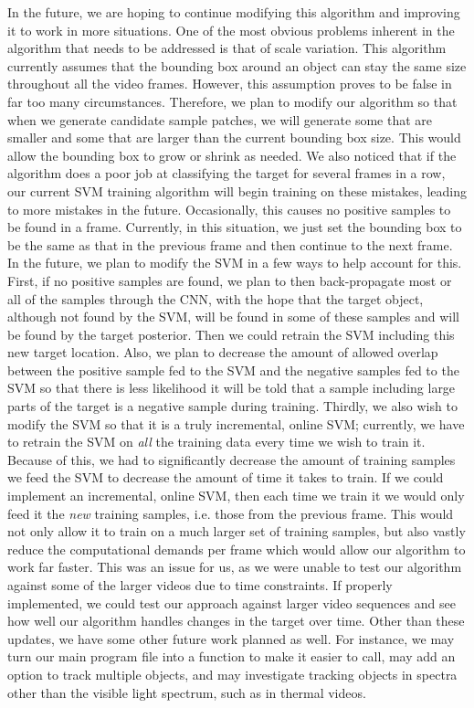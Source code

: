 \documentclass{sig-alternate-05-2015}
\begin{document}
In the future, we are hoping to continue modifying this algorithm and improving it to work in more situations.
One of the most obvious problems inherent in the algorithm that needs to be addressed is that of scale variation.
This algorithm currently assumes that the bounding box around an object can stay the same size throughout all the video frames.
However, this assumption proves to be false in far too many circumstances.
Therefore, we plan to modify our algorithm so that when we generate candidate sample patches, we will generate some that are smaller and some that are larger than the current bounding box size.
This would allow the bounding box to grow or shrink as needed.
We also noticed that if the algorithm does a poor job at classifying the target for several frames in a row, our current SVM training algorithm will begin training on these mistakes, leading to more mistakes in the future.
Occasionally, this causes no positive samples to be found in a frame. Currently, in this situation, we just set the bounding box to be the same as that in the previous frame and then continue to the next frame.
In the future, we plan to modify the SVM in a few ways to help account for this.
First, if no positive samples are found, we plan to then back-propagate most or all of the samples through the CNN, with the hope that the target object, although not found by the SVM, will be found in some of these samples and will be found by the target posterior.
Then we could retrain the SVM including this new target location.
Also, we plan to decrease the amount of allowed overlap between the positive sample fed to the SVM and the negative samples fed to the SVM so that there is less likelihood it will be told that a sample including large parts of the target is a negative sample during training.
Thirdly, we also wish to modify the SVM so that it is a truly incremental, online SVM; currently, we have to retrain the SVM on \textit{all} the training data every time we wish to train it.
Because of this, we had to significantly decrease the amount of training samples we feed the SVM to decrease the amount of time it takes to train.
If we could implement an incremental, online SVM, then each time we train it we would only feed it the \textit{new} training samples, i.e. those from the previous frame.
This would not only allow it to train on a much larger set of training samples, but also vastly reduce the computational demands per frame which would allow our algorithm to work far faster. This was an issue for us, as we were unable to test our algorithm against some of the larger videos due to time constraints. If properly implemented, we could test our approach against larger video sequences and see how well our algorithm handles changes in the target over time.
Other than these updates, we have some other future work planned as well.
For instance, we may turn our main program file into a function to make it easier to call, may add an option to track multiple objects, and may investigate tracking objects in spectra other than the visible light spectrum, such as in thermal videos.
\end{document}
